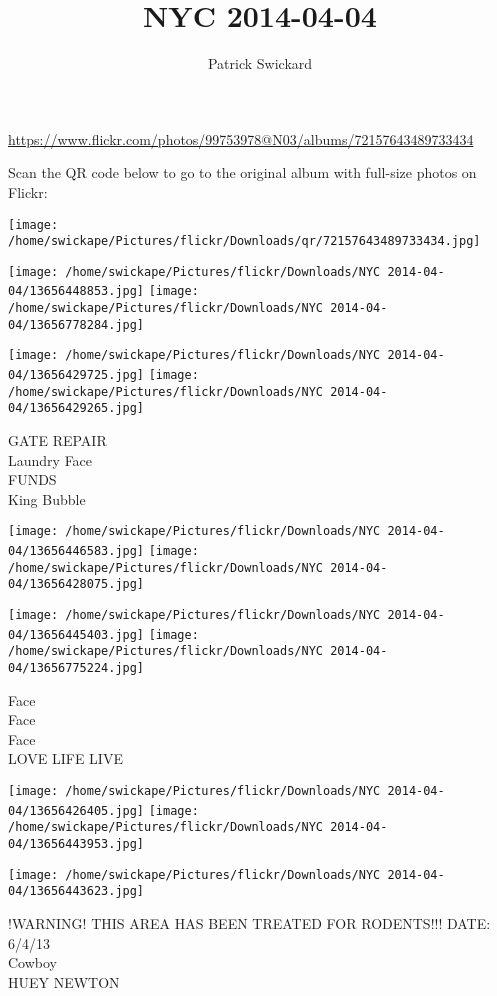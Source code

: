 \documentclass[10pt,letterpaper]{article}
\title{NYC 2014-04-04}
\author{Patrick Swickard}
\date{}
\begin{document}
\maketitle

\url{https://www.flickr.com/photos/99753978@N03/albums/72157643489733434}

Scan the QR code below to go to the original album with full-size photos on Flickr:

\texttt{[image: /home/swickape/Pictures/flickr/Downloads/qr/72157643489733434.jpg]}
\pagebreak

\texttt{[image: /home/swickape/Pictures/flickr/Downloads/NYC 2014-04-04/13656448853.jpg]}
\texttt{[image: /home/swickape/Pictures/flickr/Downloads/NYC 2014-04-04/13656778284.jpg]}

\texttt{[image: /home/swickape/Pictures/flickr/Downloads/NYC 2014-04-04/13656429725.jpg]}
\texttt{[image: /home/swickape/Pictures/flickr/Downloads/NYC 2014-04-04/13656429265.jpg]}

GATE REPAIR\\
Laundry Face\\
FUNDS\\
King Bubble
\pagebreak

\texttt{[image: /home/swickape/Pictures/flickr/Downloads/NYC 2014-04-04/13656446583.jpg]}
\texttt{[image: /home/swickape/Pictures/flickr/Downloads/NYC 2014-04-04/13656428075.jpg]}

\texttt{[image: /home/swickape/Pictures/flickr/Downloads/NYC 2014-04-04/13656445403.jpg]}
\texttt{[image: /home/swickape/Pictures/flickr/Downloads/NYC 2014-04-04/13656775224.jpg]}

Face\\
Face\\
Face\\
LOVE LIFE LIVE
\pagebreak

\texttt{[image: /home/swickape/Pictures/flickr/Downloads/NYC 2014-04-04/13656426405.jpg]}
\texttt{[image: /home/swickape/Pictures/flickr/Downloads/NYC 2014-04-04/13656443953.jpg]}

\vspace{0.25in}
\texttt{[image: /home/swickape/Pictures/flickr/Downloads/NYC 2014-04-04/13656443623.jpg]}

!WARNING! THIS AREA HAS BEEN TREATED FOR RODENTS!!! DATE: 6/4/13\\
Cowboy\\
HUEY NEWTON
\pagebreak
\end{document}
